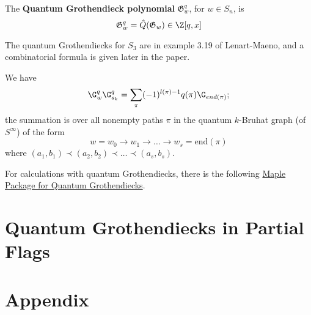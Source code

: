 \documentclass[11pt]{article}
\begin{document}
\begin{definition}
    The \textbf{Quantum Grothendieck polynomial} $\mathfrak{G}_w^q$, for $w \in S_n$, is
    \begin{equation*}
        \mathfrak{G}_w^q = \hat{Q}(\mathfrak{G}_w) \in \Z[q,x]
    \end{equation*}
\end{definition}
The quantum Grothendiecks for $S_3$ are in example 3.19 of Lenart-Maeno, and a combinatorial formula is given later in the paper. \\

\begin{theorem}

We have
\begin{equation*}
    \G_w^q \G_{s_k}^q = \sum_\pi (-1)^{l(\pi)- 1}q(\pi) \G_{end(\pi)} ; 
\end{equation*}
the summation is over all nonempty paths $\pi$ in the quantum $k$-Bruhat graph (of $S^\infty$) of the form 
\begin{equation*}
    w = w_0 \rightarrow w_1 \rightarrow \ldots \rightarrow w_s = \text{end}(\pi)
\end{equation*}
where $(a_1, b_1) \prec (a_2,b_2) \prec \ldots \prec (a_s,b_s)$.
\end{theorem}

For calculations with quantum Grothendiecks, there is the following \href{https://ow3.math.rutgers.edu/~asbuch/equivcalc/}{Maple Package for Quantum Grothendiecks}.

\section{Quantum Grothendiecks in Partial Flags}


\newpage

\section{Appendix}
\end{document}
